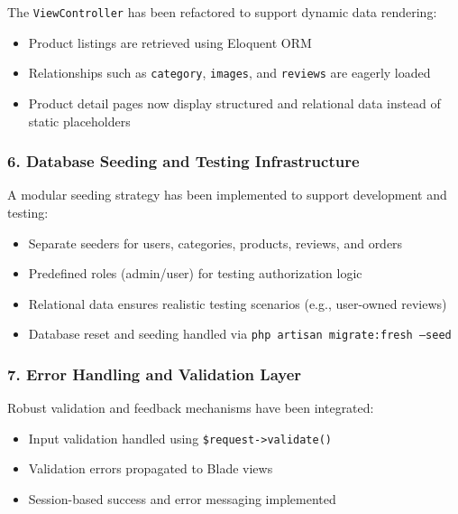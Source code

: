 \documentclass[12pt,a4paper]{article}
\begin{document}
The \texttt{ViewController} has been refactored to support dynamic data rendering:

\begin{itemize}[noitemsep]
    \item Product listings are retrieved using Eloquent ORM
    \item Relationships such as \texttt{category}, \texttt{images}, and \texttt{reviews} are eagerly loaded
    \item Product detail pages now display structured and relational data instead of static placeholders
\end{itemize}

\subsubsection{6. Database Seeding and Testing Infrastructure}

A modular seeding strategy has been implemented to support development and testing:

\begin{itemize}[noitemsep]
    \item Separate seeders for users, categories, products, reviews, and orders
    \item Predefined roles (admin/user) for testing authorization logic
    \item Relational data ensures realistic testing scenarios (e.g., user-owned reviews)
    \item Database reset and seeding handled via \texttt{php artisan migrate:fresh --seed}
\end{itemize}

\subsubsection{7. Error Handling and Validation Layer}

Robust validation and feedback mechanisms have been integrated:

\begin{itemize}[noitemsep]
    \item Input validation handled using \texttt{\$request->validate()}
    \item Validation errors propagated to Blade views
    \item Session-based success and error messaging implemented
\end{itemize}
\end{document}
